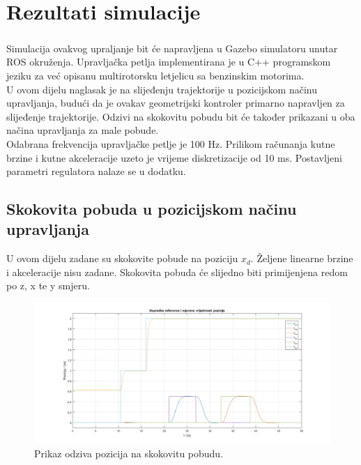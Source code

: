 \documentclass[times, utf8, diplomski]{fer}
\begin{document}
\chapter{Rezultati simulacije}

	\paragraph{}Simulacija ovakvog upraljanje bit će napravljena u Gazebo simulatoru unutar ROS okruženja. Upravljačka petlja implementirana je u C++ programskom jeziku za već opisanu multirotorsku letjelicu sa benzinskim motorima. \\
	U ovom dijelu naglasak je na slijeđenju trajektorije u pozicijskom načinu upravljanja, budući da je ovakav geometrijski kontroler primarno napravljen za slijeđenje trajektorije. Odzivi na skokovitu pobudu bit će također prikazani u oba načina upravljanja za male pobude. \\
	Odabrana frekvencija upravljačke petlje je 100 Hz. Prilikom računanja kutne brzine i kutne akceleracije uzeto je vrijeme diskretizacije od 10 ms. Postavljeni parametri regulatora nalaze se u dodatku. 
	
	\section{Skokovita pobuda u pozicijskom načinu upravljanja}
	U ovom dijelu zadane su skokovite pobude na poziciju $x_d$. Željene linearne brzine i akceleracije nisu zadane. Skokovita pobuda će slijedno biti primijenjena redom po z, x te y smjeru.
	
	\begin{figure}[h!]
		\includegraphics[width=\textwidth]{plots/pos_pos.png}
		\caption{Prikaz odziva pozicija na skokovitu pobudu.}
	\end{figure}
	
	\newpage
	\clearpage
	
\end{document}

